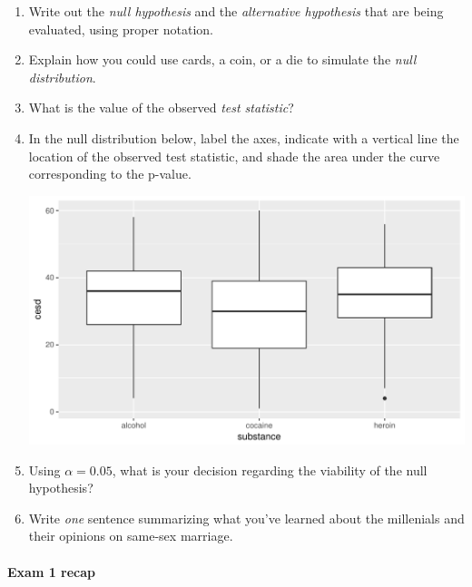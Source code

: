 \documentclass[10pt]{article}\usepackage[]{graphicx}\usepackage[]{color}
\makeatletter
\def\maxwidth{ %
  \ifdim\Gin@nat@width>\linewidth
    \linewidth
  \else
    \Gin@nat@width
  \fi
}
\newenvironment{knitrout}{}{} %
\makeatother
\begin{document}
\begin{enumerate}
  \itemsep0.8in
  \item Write out the \emph{null hypothesis} and the \emph{alternative hypothesis} that are being evaluated, using proper notation.
  \item Explain how you could use cards, a coin, or a die to simulate the \emph{null distribution}.
  \vspace{0.5in}
  \item What is the value of the observed \emph{test statistic}?
  \item In the null distribution below, label the axes, indicate with a vertical line the location of the observed test statistic, and shade the area under the curve corresponding to the p-value.
  
\begin{knitrout}
\color{fgcolor}
\includegraphics[width=\maxwidth]{figure/unnamed-chunk-1-1} 

\end{knitrout}

  \vspace{-0.5in}
  \item Using $\alpha = 0.05$, what is your decision regarding the viability of the null hypothesis?
  \item Write \emph{one} sentence summarizing what you've learned about the millenials and their opinions on same-sex marriage.  
  \vspace{0.5in}
\end{enumerate}


\paragraph{Exam 1 recap}
\end{document}
